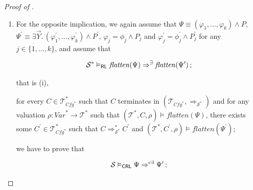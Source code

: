 \begin{proof}[Proof of ]
\begin{enumerate}
\begin{proofenv}
    \end{proofenv}
    Since we have constructed $C^\prime$ as a list of smaller configurations,
    it remains to be proven that
    \begin{proofenv}
        there exists a $\mathcal{T}$-valuation $\rho^\prime_0$
        satisfying $\rho^\prime_0(v) = \rho(v)$ for any $v \in \mathit{Var} \setminus \vec{Y}$
        such that for any $j \in \{ 1, \ldots, k \}$,
        $(\mathcal{T}, c^\prime_j, \rho^\prime_0) \vDash \varphi^\prime_j \land P$.
    \end{proofenv}
    Let us choose $\rho^\prime_0$ defined by
    $\rho_0^\prime(v) = \rho_2(v)$ for any $v \in \mathit{Var}$.
    We verify that $\rho_0^\prime(v) = \rho_2(v) = \rho_1(v) = \rho_0(v) = \rho(v)$
    for any $v \in \mathit{Var} \setminus \vec{Y}$,
    and the rest follows from the assumption (iii) by .
    This concludes the proof of the first implication.
    \item For the opposite implication, 
    we again assume that $\Psi \equiv (\varphi_1,\ldots,\varphi_k) \land P$,
    $\Psi^\prime \equiv \exists \vec{Y}.\, (\varphi_1^\prime,\ldots,\varphi_k^\prime) \land P^\prime$,
    $\varphi_j = \phi_j \land P_j$ and $\varphi^\prime_j = \phi^\prime_j \land P^\prime_j$ for any $j \in \{ 1, \ldots, k \}$,
    and assume that
    \begin{proofenv}
        \begin{equation*}
            \mathcal{S}^* \vDash_{\mathsf{RL}} \mathit{flatten}(\Psi) \Rightarrow^\exists \mathit{flatten}(\Psi^\prime) \, ;
        \end{equation*}
    \end{proofenv}
    that is (i),
    \begin{proofenv}
        for every $C \in \mathcal{T}^*_{\mathit{Cfg}^*}$ such that $C$ terminates in
        $(\mathcal{T}_{\mathit{Cfg}^*}, \Rightarrow_{\mathcal{S}^*})$
        and for any valuation $\rho : \mathit{Var}^* \to \mathcal{T}^*$ such that
        $(\mathcal{T}^*, C, \rho) \vDash \mathit{flatten}(\Psi)$,
        there exists some $C^\prime \in \mathcal{T}^*_{\mathit{Cfg}^*}$ such that
        $C \Rightarrow_{\mathcal{S}^*}^* C^\prime$
        and $(\mathcal{T}^*, C^\prime, \rho) \vDash \mathit{flatten}(\Psi^\prime)$;
    \end{proofenv}
    we have to prove that
    \begin{proofenv}
        \begin{equation*}
            \mathcal{S} \vDash_\CRL \Psi \Rightarrow^{c\exists} \Psi^\prime \, ;

\end{equation*}
\end{proofenv}
\end{enumerate}
\end{proof}
